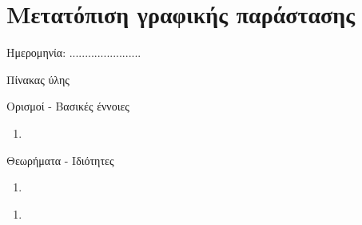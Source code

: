 \documentclass[twoside,nofonts,internet,math,spyros]{frontisthrio}
\newcommand{\myitem}{\stepcounter{enumi}\item[\raisebox{0.5mm}{\faExclamationTriangle}\ \Large$\square$]}
\begin{document}
\section{Μετατόπιση γραφικής παράστασης}
\begin{flushright}
\faCalendar* Ημερομηνία: .......................
\end{flushright}
\begin{mybox}[mysubtitle]{Πίνακας ύλης}
\begin{tcbraster}[raster columns=2,raster equal height]
\begin{myleftbox}{Ορισμοί - Βασικές έννοιες\ \ \faBook}
\begin{enumerate}[itemsep=0mm]
\item 
\end{enumerate}
\end{myleftbox}
\begin{myrightbox}{Θεωρήματα - Ιδιότητες\ \ \faTools}
\begin{enumerate}[itemsep=0mm]
\item 
\end{enumerate}
\end{myrightbox}
\end{tcbraster}
\begin{multicols}{2}
\begin{todolist}[itemsep=0mm]
\myitem 
\item 
\end{todolist}
\end{multicols}
\begin{multicols}{2}
\begin{enumerate}[itemsep=0mm]
\item 
\end{enumerate}
\end{multicols}
\end{mybox}
\newpage
\end{document}
